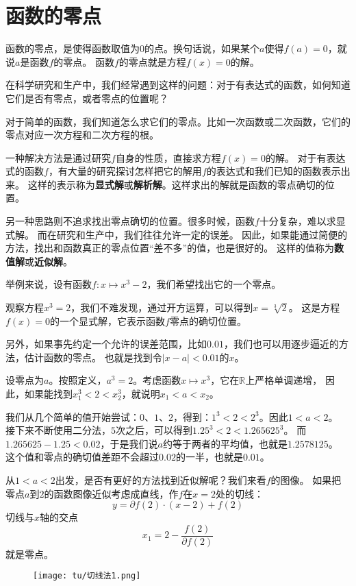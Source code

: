 \documentclass[12pt,UTF8]{ctexbook}
\theoremstyle{definition}
\theoremstyle{plain}
\begin{document}
\section{函数的零点}

函数的零点，是使得函数取值为$0$的点。换句话说，如果某个$a$使得$f(a) = 0$，就说$a$是函数$f$的零点。
函数$f$的零点就是方程$f(x) = 0$的解。

在科学研究和生产中，我们经常遇到这样的问题：对于有表达式的函数，如何知道它们是否有零点，或者零点的位置呢？

对于简单的函数，我们知道怎么求它们的零点。比如一次函数或二次函数，它们的零点对应一次方程和二次方程的根。

一种解决方法是通过研究$f$自身的性质，直接求方程$f(x) = 0$的解。
对于有表达式的函数$f$，有大量的研究探讨怎样把它的解用$f$的表达式和我们已知的函数表示出来。
这样的表示称为\textbf{显式解}或\textbf{解析解}。这样求出的解就是函数的零点确切的位置。

另一种思路则不追求找出零点确切的位置。很多时候，函数$f$十分复杂，难以求显式解。
而在研究和生产中，我们往往允许一定的误差。
因此，如果能通过简便的方法，找出和函数真正的零点位置“差不多”的值，也是很好的。
这样的值称为\textbf{数值解}或\textbf{近似解}。

举例来说，设有函数$f: x\mapsto x^3 - 2$，我们希望找出它的一个零点。

观察方程$x^3 = 2$，我们不难发现，通过开方运算，可以得到$x = \sqrt[3]{2}$。
这是方程$f(x) = 0$的一个显式解，它表示函数$f$零点的确切位置。

另外，如果事先约定一个允许的误差范围，比如$0.01$，我们也可以用逐步逼近的方法，估计函数的零点。
也就是找到令$|x - a| < 0.01$的$x$。

设零点为$a$。按照定义，$a^3 = 2$。考虑函数$x\mapsto x^3$，它在$\mathbb{R}$上严格单调递增，
因此，如果能找到$x_1^3 < 2 < x_2^3$，就说明$x_1 < a < x_2$。

我们从几个简单的值开始尝试：$0$、$1$、$2$，得到：$1^3 < 2 < 2^3$。因此$1 < a < 2$。
接下来不断使用二分法，$5$次之后，可以得到$1.25^3 < 2 < 1.265625^3$。
而$1.265625 - 1.25 < 0.02$，于是我们说$a$约等于两者的平均值，也就是$1.2578125$。
这个值和零点的确切值差距不会超过$0.02$的一半，也就是$0.01$。

从$1 < a < 2$出发，是否有更好的方法找到近似解呢？我们来看$f$的图像。
如果把零点$a$到$2$的函数图像近似考虑成直线，作$f$在$x=2$处的切线：
$$ y = \partial f(2)\cdot (x - 2) + f(2) $$
切线与$x$轴的交点
$$ x_1 = 2 - \frac{f(2)}{\partial f(2)} $$
就是零点。

\begin{figure}[h]
    \vspace{4pt}
    \centering
    \texttt{[image: tu/切线法1.png]}
\end{figure}
\end{document}
